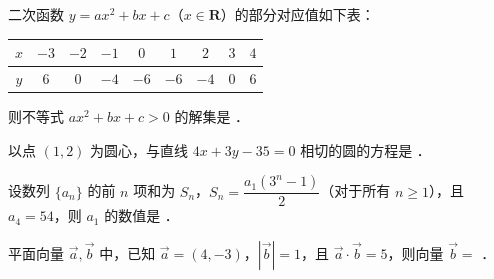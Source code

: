 \begin{question}
二次函数 $y = ax^2 + bx + c$（$x \in \mathbf{R}$）的部分对应值如下表：

\begin{center}
\begingroup\setlength{\tabcolsep}{4pt}
\begin{tabular}{ccccccccc}
\toprule
$x$ & $-3$ & $-2$ & $-1$ & $0$ & $1$ & $2$ & $3$ & $4$ \\
\midrule
$y$ & $6$ & $0$ & $-4$ & $-6$ & $-6$ & $-4$ & $0$ & $6$ \\
\bottomrule
\end{tabular}
\endgroup
\end{center}

则不等式 $ax^2 + bx + c > 0$ 的解集是 \underline{\hspace{3cm}}．

\end{question}
\begin{question}
以点 $(1, 2)$ 为圆心，与直线 $4x + 3y - 35 = 0$ 相切的圆的方程是 \underline{\hspace{3cm}}．

\end{question}
\begin{question}
设数列 $\{a_n\}$ 的前 $n$ 项和为 $S_n$，$S_n = \dfrac{a_1(3^n - 1)}{2}$（对于所有 $n \geqslant 1$），且 $a_4 = 54$，则 $a_1$ 的数值是 \underline{\hspace{3cm}}．

\end{question}
\begin{question}
平面向量 $\vec{a}, \vec{b}$ 中，已知 $\vec{a} = (4, -3)$，$|\vec{b}| = 1$，且 $\vec{a} \cdot \vec{b} = 5$，则向量 $\vec{b} =$ \underline{\hspace{3cm}}．

\end{question}

